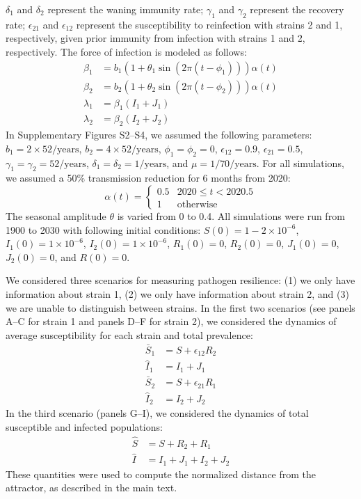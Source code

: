 \documentclass[12pt]{article}
\begin{document}
$\delta_1$ and $\delta_2$ represent the waning immunity rate;
$\gamma_1$ and $\gamma_2$ represent the recovery rate;
$\epsilon_{21}$ and $\epsilon_{12}$ represent the susceptibility to reinfection with strains 2 and 1, respectively, given prior immunity from infection with strains 1 and 2, respectively. 
The force of infection is modeled as follows:
\begin{align}
\beta_1 &= b_1 (1 + \theta_1 \sin(2 \pi (t-\phi_1))) \alpha(t)\\
\beta_2 &= b_2 (1 + \theta_2 \sin(2 \pi (t-\phi_2))) \alpha(t)\\
\lambda_1 &= \beta_1 (I_1 + J_1)\\
\lambda_2 &= \beta_2 (I_2 + J_2)
\end{align}
In Supplementary Figures S2--S4, we assumed the following parameters:
$b_1 = 2 \times 52/\mathrm{years}$, $b_2 = 4 \times 52/\mathrm{years}$, $\phi_1 = \phi_2 = 0$, $\epsilon_{12} = 0.9$, $\epsilon_{21} = 0.5$,
$\gamma_1 = \gamma_2 = 52/\mathrm{years}$, $\delta_1 = \delta_2 = 1/\mathrm{years}$, and $\mu=1/70/\mathrm{years}$.
For all simulations, we assumed a 50\% transmission reduction for 6 months from 2020:
\begin{equation}
\alpha(t) = \begin{cases}
0.5 & 2020 \leq t< 2020.5\\
1 & \textrm{otherwise}
\end{cases}
\end{equation}
The seasonal amplitude $\theta$ is varied from 0 to 0.4.
All simulations were run from 1900 to 2030 with following initial conditions: 
$S(0) = 1 - 2\times 10^{-6}$, $I_1(0) = 1 \times 10^{-6}$, $I_2(0) = 1 \times 10^{-6}$, $R_1(0) = 0$, $R_2(0) = 0$, $J_1(0) = 0$, $J_2(0) = 0$, and $R(0) = 0$.

We considered three scenarios for measuring pathogen resilience: (1) we only have information about strain 1, (2) we only have information about strain 2, and (3) we are unable to distinguish between strains.
In the first two scenarios (see panels A--C for strain 1 and panels D--F for strain 2), we considered the dynamics of average susceptibility for each strain and total prevalence:
\begin{align}
\bar{S}_1 &= S + \epsilon_{12} R_2\\
\hat{I}_1 &= I_1 + J_1\\
\bar{S}_2 &= S + \epsilon_{21} R_1\\
\hat{I}_2 &= I_2 + J_2
\end{align}
In the third scenario (panels G--I), we considered the dynamics of total susceptible and infected populations:
\begin{align}
\hat{S} &= S + R_2 + R_1\\
\hat{I} &= I_1 + J_1 + I_2 + J_2
\end{align}
These quantities were used to compute the normalized distance from the attractor, as described in the main text.
\end{document}
